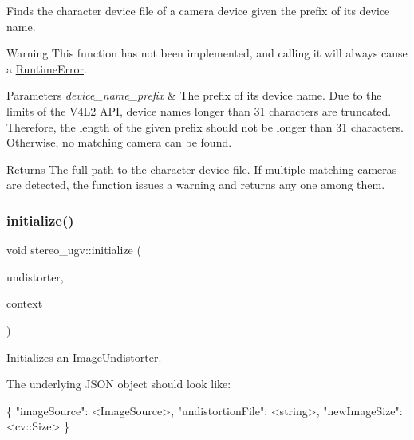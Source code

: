 Finds the character device file of a camera device given the prefix of its device name. 

\begin{DoxyWarning}{Warning}
This function has not been implemented, and calling it will always cause a \hyperlink{classstereo__ugv_1_1RuntimeError}{Runtime\+Error}. 
\end{DoxyWarning}

\begin{DoxyParams}{Parameters}
{\em device\+\_\+name\+\_\+prefix} & The prefix of its device name. Due to the limits of the V4\+L2 A\+PI, device names longer than 31 characters are truncated. Therefore, the length of the given prefix should not be longer than 31 characters. Otherwise, no matching camera can be found. \\
\hline
\end{DoxyParams}
\begin{DoxyReturn}{Returns}
The full path to the character device file. If multiple matching cameras are detected, the function issues a warning and returns any one among them. 
\end{DoxyReturn}
\mbox{\label{namespacestereo__ugv_ab607b745fcce81036bd29780d14513e5}} 
\subsubsection{\texorpdfstring{initialize()}{initialize()}\hspace{0.1cm}{\footnotesize\ttfamily [1/9]}}
{\footnotesize\ttfamily void stereo\+\_\+ugv\+::initialize (\begin{DoxyParamCaption}\item[{\hyperlink{classstereo__ugv_1_1ImageUndistorter}{Image\+Undistorter} $\ast$}]{undistorter,  }\item[{const \hyperlink{classstereo__ugv_1_1Context}{Context} \&}]{context }\end{DoxyParamCaption})}



Initializes an \hyperlink{classstereo__ugv_1_1ImageUndistorter}{Image\+Undistorter}. 

The underlying J\+S\+ON object should look like\+: 
\begin{DoxyCode}
\{
  \textcolor{stringliteral}{"imageSource"}: <ImageSource>,
  \textcolor{stringliteral}{"undistortionFile"}: <\textcolor{keywordtype}{string}>,
  \textcolor{stringliteral}{"newImageSize"}: <cv::Size>
\}
\end{DoxyCode}
 
